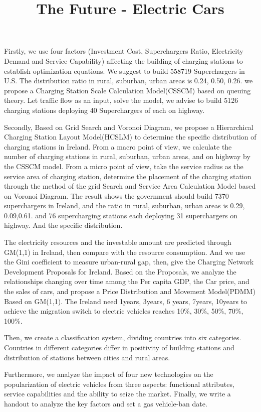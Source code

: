 \documentclass{mcmthesis}
\title{The Future - Electric Cars}
\begin{document}
\begin{sheetsummary}


\par Firstly, we use four factors (Investment Cost, Superchargers Ratio, Electricity Demand and Service Capability) affecting the building of charging stations to establish optimization equations. We suggest to build 558719 Superchargers in U.S. The distribution ratio in rural, suburban, urban areas is 0.24, 0.50, 0.26. we propose a Charging Station Scale Calculation Model(CSSCM) based on queuing theory. Let traffic flow as an input, solve the model, we advise to build 5126 charging stations deploying 40 Superchargers of each on highway.

\par Secondly, Based on Grid Search and Voronoi Diagram, we propose a Hierarchical Charging Station Layout Model(HCSLM) to determine the specific distribution of charging stations in Ireland. From a macro point of view, we calculate the number of charging stations in rural, suburban, urban areas, and on highway by the CSSCM model. From a micro point of view, take the service radius as the service area of charging station, determine the placement of the charging station through the method of the grid Search and Service Area Calculation Model based on Voronoi Diagram. The result shows the government should build 7370 superchargers in Ireland, and the ratio in rural, suburban, urban areas is 0.29, 0.09,0.61. and 76 supercharging stations each deploying 31 superchargers on highway. And the specific distribution.
\par The electricity resources and the investable amount are predicted through GM(1,1) in Ireland, then compare with the resource consumption. And we use the Gini coefficient to measure urban-rural gap, then, give the Charging Network Development Proposals for Ireland. Based on the Proposals, we analyze the relationships changing over time among the Per capita GDP, the Car price, and the sales of cars, and propose a Price Distribution and Movement Model(PDMM) Based on GM(1,1). The Ireland need 1years, 3years, 6 years, 7years, 10years to achieve the migration switch to electric vehicles reaches 10\%, 30\%, 50\%, 70\%, 100\%.
\par Then, we create a classification system, dividing countries into six categories. Countries in different categories differ in positivity of building stations and distribution of stations between cities and rural areas.
\par Furthermore, we analyze the impact of four new technologies on the popularization of electric vehicles from three aspects: functional attributes, service capabilities and the ability to seize the market. 
Finally, we write a handout to analyze the key factors and set a gas vehicle-ban date. 


\end{sheetsummary}
\end{document}
